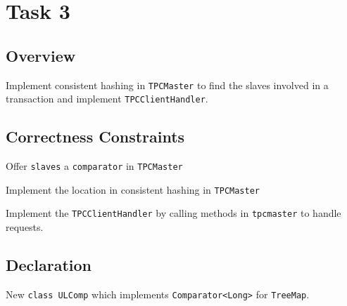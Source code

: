 \documentclass{article}
\begin{document}
\section{Task 3}
\subsection{Overview}
Implement consistent hashing in \texttt{TPCMaster} to find the slaves involved in a transaction and implement \texttt{TPCClientHandler}.
\subsection{Correctness Constraints}
\begin{compactitem}
	\item Offer \texttt{slaves} a \texttt{comparator} in \texttt{TPCMaster}
	\item Implement the location in consistent hashing in \texttt{TPCMaster}
	\item Implement the \texttt{TPCClientHandler} by calling methods in \texttt{tpcmaster} to handle requests.
\end{compactitem}
\subsection{Declaration}
\begin{compactitem}
	\item New \texttt{class ULComp} which implements \texttt{Comparator<Long>} for \texttt{TreeMap}.
\end{compactitem}
\end{document}
